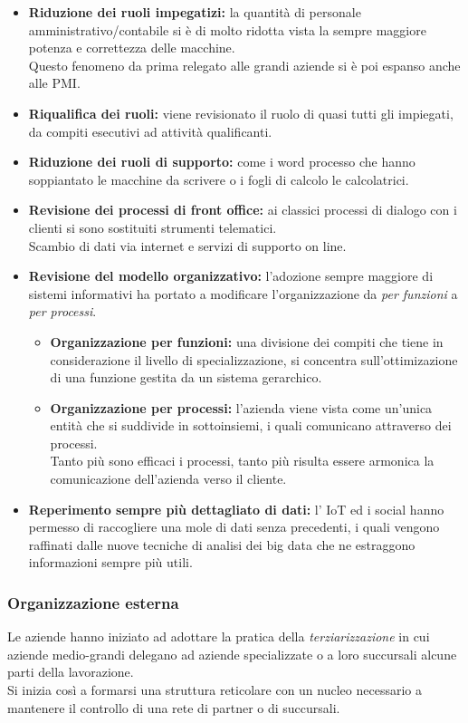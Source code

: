 \documentclass{book}
\begin{document}
    \begin{itemize}
        \item \textbf{Riduzione dei ruoli impegatizi:} la quantità di personale amministrativo/contabile si è di molto ridotta vista la sempre maggiore potenza e correttezza delle macchine.\\
            Questo fenomeno da prima relegato alle grandi aziende si è poi espanso anche alle PMI.
        \item \textbf{Riqualifica dei ruoli:} viene revisionato il ruolo di quasi tutti gli impiegati, da compiti esecutivi ad attività qualificanti.
        \item \textbf{Riduzione dei ruoli di supporto:} come i word processo che hanno soppiantato le macchine da scrivere o i fogli di calcolo le calcolatrici.
        \item \textbf{Revisione dei processi di front office:} ai classici processi di dialogo con i clienti si sono sostituiti strumenti telematici.\\
            Scambio di dati via internet e servizi di supporto on line.
        \item \textbf{Revisione del modello organizzativo:} l'adozione sempre maggiore di sistemi informativi ha portato a modificare l'organizzazione da \emph{per funzioni} a \emph{per processi}.
        \begin{itemize}
            \item \textbf{Organizzazione per funzioni:} una divisione dei compiti che tiene in considerazione il livello di specializzazione, si concentra sull'ottimizazione di una funzione gestita da un sistema gerarchico.
            \item \textbf{Organizzazione per processi:} l'azienda viene vista come un'unica entità che si suddivide in sottoinsiemi, i quali comunicano attraverso dei processi.\\
                Tanto più sono efficaci i processi, tanto più risulta essere armonica la comunicazione dell'azienda verso il cliente.
        \end{itemize}
        \item \textbf{Reperimento sempre più dettagliato di dati:} l' IoT ed i social hanno permesso di raccogliere una mole di dati senza precedenti, i quali vengono raffinati dalle nuove tecniche di analisi dei big data che ne estraggono informazioni sempre più utili.
    \end{itemize}
    \subsubsection{Organizzazione esterna}
    Le aziende hanno iniziato ad adottare la pratica della \emph{terziarizzazione} in cui aziende medio-grandi delegano ad aziende specializzate o a loro succursali alcune parti della lavorazione.\\
    Si inizia così a formarsi una struttura reticolare con un nucleo necessario a mantenere il controllo di una rete di partner o di succursali.
\end{document}
